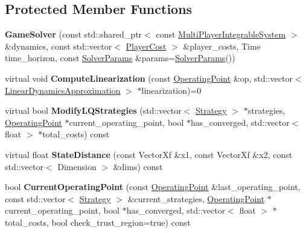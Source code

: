 \subsection*{Protected Member Functions}
\begin{DoxyCompactItemize}
\item 
{\bfseries Game\+Solver} (const std\+::shared\+\_\+ptr$<$ const \hyperlink{classilqgames_1_1_multi_player_integrable_system}{Multi\+Player\+Integrable\+System} $>$ \&dynamics, const std\+::vector$<$ \hyperlink{classilqgames_1_1_player_cost}{Player\+Cost} $>$ \&player\+\_\+costs, Time time\+\_\+horizon, const \hyperlink{structilqgames_1_1_solver_params}{Solver\+Params} \&params=\hyperlink{structilqgames_1_1_solver_params}{Solver\+Params}())\hypertarget{classilqgames_1_1_game_solver_a89a591bb5d9fcefc28157a54b016a4d1}{}\label{classilqgames_1_1_game_solver_a89a591bb5d9fcefc28157a54b016a4d1}

\item 
virtual void {\bfseries Compute\+Linearization} (const \hyperlink{structilqgames_1_1_operating_point}{Operating\+Point} \&op, std\+::vector$<$ \hyperlink{structilqgames_1_1_linear_dynamics_approximation}{Linear\+Dynamics\+Approximation} $>$ $\ast$linearization)=0\hypertarget{classilqgames_1_1_game_solver_a4a1772a9bd07347ed28455119b2571fe}{}\label{classilqgames_1_1_game_solver_a4a1772a9bd07347ed28455119b2571fe}

\item 
virtual bool {\bfseries Modify\+L\+Q\+Strategies} (std\+::vector$<$ \hyperlink{structilqgames_1_1_strategy}{Strategy} $>$ $\ast$strategies, \hyperlink{structilqgames_1_1_operating_point}{Operating\+Point} $\ast$current\+\_\+operating\+\_\+point, bool $\ast$has\+\_\+converged, std\+::vector$<$ float $>$ $\ast$total\+\_\+costs) const \hypertarget{classilqgames_1_1_game_solver_a5dffdeb025d68e884d4172994d21a3c4}{}\label{classilqgames_1_1_game_solver_a5dffdeb025d68e884d4172994d21a3c4}

\item 
virtual float {\bfseries State\+Distance} (const Vector\+Xf \&x1, const Vector\+Xf \&x2, const std\+::vector$<$ Dimension $>$ \&dims) const \hypertarget{classilqgames_1_1_game_solver_a413329f89a63805c387e35a99b53ad73}{}\label{classilqgames_1_1_game_solver_a413329f89a63805c387e35a99b53ad73}

\item 
bool {\bfseries Current\+Operating\+Point} (const \hyperlink{structilqgames_1_1_operating_point}{Operating\+Point} \&last\+\_\+operating\+\_\+point, const std\+::vector$<$ \hyperlink{structilqgames_1_1_strategy}{Strategy} $>$ \&current\+\_\+strategies, \hyperlink{structilqgames_1_1_operating_point}{Operating\+Point} $\ast$current\+\_\+operating\+\_\+point, bool $\ast$has\+\_\+converged, std\+::vector$<$ float $>$ $\ast$total\+\_\+costs, bool check\+\_\+trust\+\_\+region=true) const \hypertarget{classilqgames_1_1_game_solver_aec793cd5afb9cf01102fb2c5d852d186}{}\label{classilqgames_1_1_game_solver_aec793cd5afb9cf01102fb2c5d852d186}

\end{DoxyCompactItemize}
